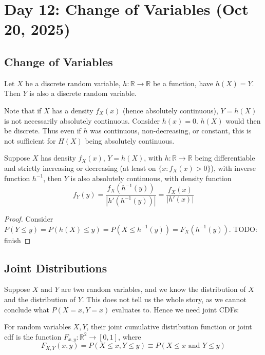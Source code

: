 \section{Day 12: Change of Variables (Oct 20, 2025)}

\subsection{Change of Variables}

\begin{simplethm}
    Let $X$ be a discrete random variable, $h : \mathbb{R} \to \mathbb{R}$ be a function, have $h(X) = Y$. Then $Y$ is also a discrete random variable. 
\end{simplethm}

Note that if $X$ has a density $f_X(x)$ (hence absolutely continuous), $Y = h(X)$ is not necessarily absolutely continuous. Consider $h(x) = 0$. $h(X)$ would then be discrete. Thus even if $h$ was continuous, non-decreasing, or constant, this is not sufficient for $H(X)$ being absolutely continuous. 

\begin{theorem}
    Suppose $X$ has density $f_X(x)$, $Y = h(X)$, with $h : \mathbb{R} \to \mathbb{R}$ being differentiable and strictly increasing or decreasing (at least on $\{ x : f_X(x) > 0 \}$), with inverse function $h ^{-1}$, then $Y$ is also absolutely continuous, with density function
    \[
    f_Y(y) = \frac{f_X(h ^{-1}(y))}{ | h'(h ^{-1} (y))| } = \frac{f_X(x)}{|h'(x)|}
    \]
\end{theorem}
\begin{proof}
    Consider $P(Y \leq y) = P(h(X) \leq y) = P(X \leq h ^{-1} (y)) = F_X(h ^{-1} (y))$. TODO: finish
\end{proof}

\subsection{Joint Distributions}
Suppose $X$ and $Y$ are two random variables, and we know the distribution of $X$ and the distribution of $Y$. This does not tell us the whole story, as we cannot conclude what $P(X = x, Y = x)$ evaluates to. Hence we need joint CDFs:

\begin{definition}
    For random variables $X, Y$, their joint cumulative distribution function or joint cdf is the function $F_{x, y} : \mathbb{R}^2 \to [0, 1]$, where
    \[
    F_{X, Y}(x, y) = P(X \leq x, Y \leq y) \equiv P(X \leq x \text{ and } Y \leq y)
    \]
\end{definition}


